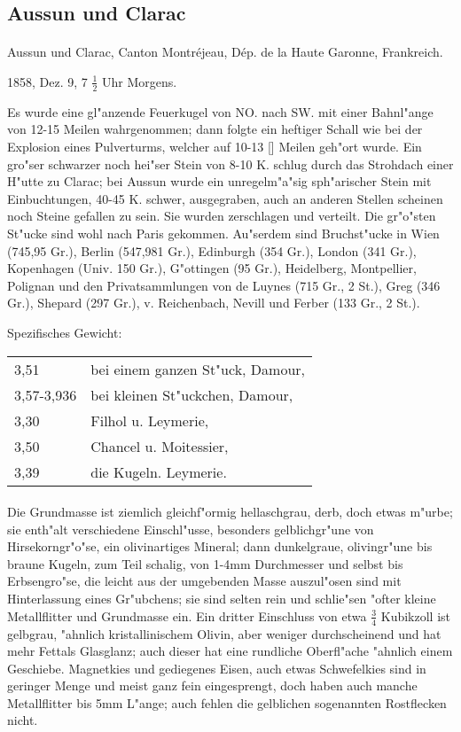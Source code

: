\documentclass[a4paper, 11pt, oneside]{article}
\begin{document}
\subsection{Aussun und Clarac}
\normalsize
\paragraph{}
Aussun und Clarac, Canton Montréjeau, Dép. de la Haute Garonne, Frankreich.

1858, Dez. 9, 7 $\frac{1}{2}$ Uhr Morgens.

Es wurde eine gl"anzende Feuerkugel von NO. nach SW. mit einer Bahnl"ange von 12-15 Meilen wahrgenommen; dann folgte ein heftiger Schall wie bei der Explosion eines Pulverturms, welcher auf 10-13 [] Meilen geh"ort wurde. Ein gro"ser schwarzer noch hei"ser Stein von 8-10 K. schlug durch das Strohdach einer H"utte zu Clarac; bei Aussun wurde ein unregelm"a"sig sph"arischer Stein mit Einbuchtungen, 40-45 K. schwer, ausgegraben, auch an anderen Stellen scheinen noch Steine gefallen zu sein. Sie wurden zerschlagen und verteilt. Die gr"o"sten St"ucke sind wohl nach Paris gekommen. Au"serdem sind Bruchst"ucke in Wien (745,95 Gr.), Berlin (547,981 Gr.), Edinburgh (354 Gr.), London (341 Gr.), Kopenhagen (Univ. 150 Gr.), G"ottingen (95 Gr.), Heidelberg, Montpellier, Polignan und den Privatsammlungen von de Luynes (715 Gr., 2 St.), Greg (346 Gr.), Shepard (297 Gr.), v. Reichenbach, Nevill und Ferber (133 Gr., 2 St.).

Spezifisches Gewicht:  
\begin{table}[!ht]
    \centering
    \begin{tabular}{l l}
        3,51 & bei einem ganzen St"uck, Damour,\\
        3,57-3,936 & bei kleinen St"uckchen, Damour,\\
        3,30 & Filhol u. Leymerie,\\
        3,50 & Chancel u. Moitessier,\\
        3,39 & die Kugeln. Leymerie.
    \end{tabular}
\end{table}
\paragraph{}
Die Grundmasse ist ziemlich gleichf"ormig hellaschgrau, derb, doch etwas m"urbe; sie enth"alt verschiedene Einschl"usse, besonders gelblichgr"une von Hirsekorngr"o"se, ein olivinartiges Mineral; dann dunkelgraue, olivingr"une bis braune Kugeln, zum Teil schalig, von 1-4mm Durchmesser und selbst bis Erbsengro"se, die leicht aus der umgebenden Masse auszul"osen sind mit Hinterlassung eines Gr"ubchens; sie sind selten rein und schlie"sen "ofter kleine Metallflitter und Grundmasse ein. Ein dritter Einschluss von etwa $\frac{3}{4}$ Kubikzoll ist gelbgrau, "ahnlich kristallinischem Olivin, aber weniger durchscheinend und hat mehr Fettals Glasglanz; auch dieser hat eine rundliche Oberfl"ache "ahnlich einem Geschiebe. Magnetkies und gediegenes Eisen, auch etwas Schwefelkies sind in geringer Menge und meist ganz fein eingesprengt, doch haben auch manche Metallflitter bis 5mm L"ange; auch fehlen die gelblichen sogenannten Rostflecken nicht.
\end{document}
